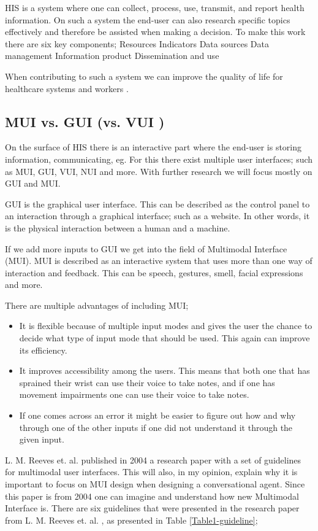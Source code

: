 \documentclass[fleqn,10pt]{wlscirep}
\begin{document}
HIS is a system where one can collect, process, use, transmit, and report health information. On such a system the end-user can also research specific topics effectively and therefore be assisted when making a decision. To make this work there are six key components\cite{M_Kilde10};
Resources
Indicators 
Data sources
Data management
Information product
Dissemination and use

When contributing to such a system we can improve the quality of life for healthcare systems and workers\cite{M_Kilde14} . 

\subsection{MUI vs. GUI (vs. VUI )}
On the surface of HIS there is an interactive part where the end-user is storing information, communicating, eg. For this there exist multiple user interfaces; such as MUI, GUI, VUI, NUI and more. With further research we will focus mostly on GUI and MUI. 

GUI is the graphical user interface. This can be described as the control panel to an interaction through a graphical interface; such as a website. In other words, it is the physical interaction between a human and a machine\cite{M_Kilde11}.

If we add more inputs to GUI we get into the field of Multimodal Interface (MUI). MUI is described as an interactive system that uses more than one way of interaction and feedback. This can be speech, gestures, smell, facial expressions and more\cite{M_Kilde12}. 

There are multiple advantages of including MUI\cite{M_Kilde12}; 
\begin{itemize}
\item It is flexible because of multiple input modes and gives the user the chance to decide what type of input mode that should be used. This again can improve its efficiency.  
\item It improves accessibility among the users. This means that both one that has sprained their wrist can use their voice to take notes, and if one has movement impairments one can use their voice to take notes. 
\item If one comes across an error it might be easier to figure out how and why through one of the other inputs if one did not understand it through the given input. 
\end{itemize}
L. M. Reeves et. al. \cite{M_Kilde13} published in 2004 a research paper with a set of guidelines for multimodal user interfaces. This will also, in my opinion, explain why it is important to focus on MUI design when designing a conversational agent. Since this paper is from 2004 one can imagine and understand how new Multimodal Interface is. There are six guidelines that were presented in the research paper from L. M. Reeves et. al. \cite{M_Kilde13}, as presented in Table \ref{Table1-guideline}; 
\end{document}
